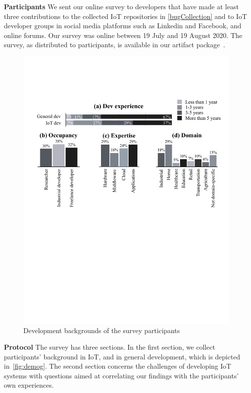 \textbf{Participants} 
We sent our online survey to developers that have made at least three contributions to the collected IoT repositories in \autoref{bugCollection} and to IoT developer groups in social media platforms such as Linkedin and Facebook, and online forums. Our survey was online between 19 July and 19 August 2020. The survey, as distributed to participants, is available in our artifact package~\cite{repPack}.
 \begin{figure}[h]
  \centering
   \includegraphics[width=\linewidth]{imgs/demog.pdf}
  \caption{Development backgrounds of the survey participants}
  \label{fig:demog}
\end{figure}

\textbf{Protocol}
The survey has three sections. In the first section, we collect participants' background in IoT, and in general development, which is depicted in~\autoref{fig:demog}. The second section concerns the challenges of developing IoT systems with questions aimed at correlating our findings with the participants' own experiences. 

